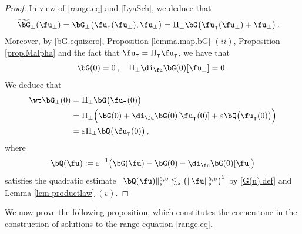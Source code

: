 \documentclass[a4paper,reqno,10pt]{article}
\begin{document}
\begin{proof}
    In view of \eqref{range.eq} and \eqref{LyaSch}, we deduce that
    \begin{align}
        \widetilde{\bG}_{\perp} (\fu_{\perp})  & = \bG_{\perp}\big( \fu_{\intercal}(\fu_{\perp}),\fu_{\perp} \big)  = \Pi_{\perp}\bG\big( \fu_{\intercal}(\fu_{\perp})+\fu_{\perp}  \big)  \,. 
    \end{align}
    Moreover, by \eqref{bG.equizero}, Proposition \ref{lemma.map.bG}-$(ii)$, Proposition \ref{prop.Malpha} and the fact that $\fu_{\intercal}=\Pi_{\intercal} \fu_{\intercal}$, 
    we have that
    \begin{equation}
        \bG(0) = 0 \,, \quad \Pi_{\perp} \di_{\fu} \bG(0) [\fu_{\perp}] = 0 \,.
    \end{equation}
    We deduce that
    \begin{align*}
      {\wt\bG_{\perp}(0)} & = {\Pi_{\perp}} {\bG}\big( \fu_{\intercal}(0) \big) \\
        & = \Pi_{\perp}\Big( \bG(0) + \di_{\fu}\bG(0)[\fu_{\intercal}(0)] +  \varepsilon \bQ\big(\fu_{\intercal}(0)\big) \Big) \\
         & = \varepsilon \Pi_{\perp} \bQ\big(\fu_{\intercal}(0)\big)\,,
    \end{align*}
    where
    \begin{equation}
        {\bQ}(\fu) := \varepsilon^{-1}\big( \bG(\fu) - \bG(0) - \di_{\fu} \bG(0)[\fu] \big)
    \end{equation}
    satisfies the quadratic estimate $\|\bQ(\fu) \|_{s}^{5,\upsilon}\lesssim_{s} \big( \| \fu\|_{s}^{5,\upsilon}\big)^2 $ by \eqref{G(u).def} and Lemma \ref{lem-productlaw}-$(v)$. 
\end{proof}
We now prove the following proposition, which constitutes the cornerstone in the construction of solutions to the range equation \eqref{range.eq}.
\end{document}
